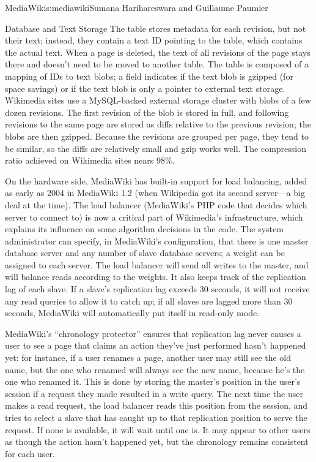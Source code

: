 \begin{aosachapter}{MediaWiki}{s:mediawiki}{Sumana Harihareswara and Guillaume Paumier}
\begin{aosasect1}{Database and Text Storage}
The  table stores metadata for each revision, but not
their text; instead, they contain a text ID pointing to the
 table, which contains the actual text. When a page is
deleted, the text of all revisions of the page stays there and doesn't
need to be moved to another table. The  table is composed
of a mapping of IDs to text blobs; a  field indicates if the text
blob is gzipped (for space savings) or if the text blob is only a
pointer to external text storage. Wikimedia sites use a MySQL-backed
external storage cluster with blobs of a few dozen revisions. The
first revision of the blob is stored in full, and following revisions
to the same page are stored as diffs relative to the previous
revision; the blobs are then gzipped. Because the revisions are
grouped per page, they tend to be similar, so the diffs are relatively
small and gzip works well. The compression ratio achieved on Wikimedia
sites nears 98\%.

On the hardware side, MediaWiki has built-in support for load
balancing, added as early as 2004 in MediaWiki 1.2 (when Wikipedia got
its second server---a big deal at the time). The load balancer
(MediaWiki's PHP code that decides which server to connect to) is now
a critical part of Wikimedia's infrastructure, which explains its
influence on some algorithm decisions in the code. The system
administrator can specify, in MediaWiki's configuration, that there is
one master database server and any number of slave database servers;
a weight can be assigned to each server. The load balancer will send
all writes to the master, and will balance reads according to the
weights. It also keeps track of the replication lag of each slave. If
a slave's replication lag exceeds 30 seconds, it will not receive any
read queries to allow it to catch up; if all slaves are lagged more
than 30 seconds, MediaWiki will automatically put itself in read-only
mode.

MediaWiki's ``chronology protector'' ensures that replication lag never
causes a user to see a page that claims an action they've just
performed hasn't happened yet: for instance, if a user renames a page,
another user may still see the old name, but the one who renamed will
always see the new name, because he's the one who renamed it. This is
done by storing the master's position in the user's session if a
request they made resulted in a write query. The next time the user
makes a read request, the load balancer reads this position from the
session, and tries to select a slave that has caught up to that
replication position to serve the request. If none is available, it
will wait until one is. It may appear to other users as though the
action hasn't happened yet, but the chronology remains consistent for
each user.


\end{aosasect1}
\end{aosachapter}
